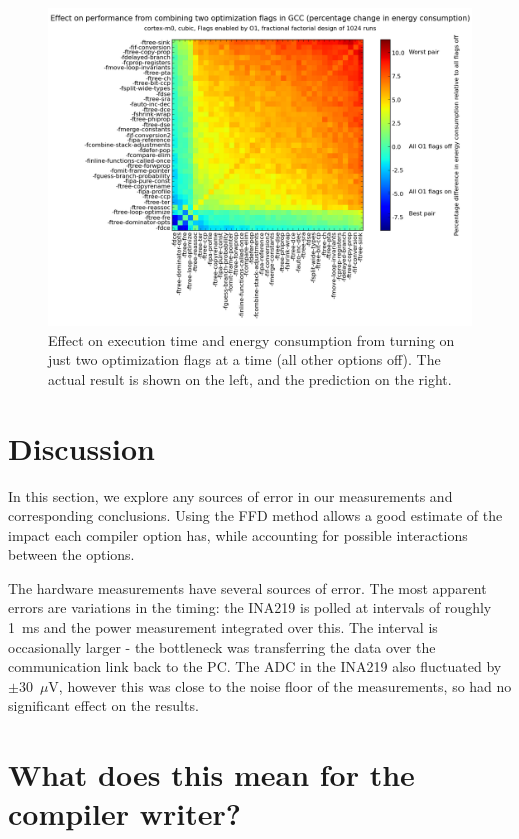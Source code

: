 \documentclass[twocolumn]{article}
\let\oldcaption\caption
\renewcommand{\caption}[1]{\oldcaption{\textup{#1}}}
\begin{document}
\begin{figure}
\begin{minipage}[r]{0.95\columnwidth}
		\includegraphics[width=0.9\linewidth, clip, trim= 8.8cm 0 7cm 2cm]{cortex-m0/o1cub_-7p5_10_pred.png}
    \end{minipage}
    \caption{Effect on execution time and energy consumption from turning on just two optimization flags at a time (all other options off). The actual result is shown on the left, and the prediction on the right.}
    \label{Fig:twoway_cubic}
\end{figure}



\section{Discussion}

In this section, we explore any sources of error in our measurements and corresponding conclusions.
Using the FFD method allows a good estimate of the impact each compiler option has, while accounting for possible interactions between the options.

The hardware measurements have several sources of error. The most apparent errors are variations in the timing: the INA219 is polled at intervals of roughly 1~ms and the power measurement integrated over this. The interval is occasionally larger - the bottleneck was transferring the data over the communication link back to the PC. The ADC in the INA219 also fluctuated by $\pm$30~$\mu$V, however this was close to the noise floor of the measurements, so had no significant effect on the results.

\section{What does this mean for the compiler writer?}
\end{document}
